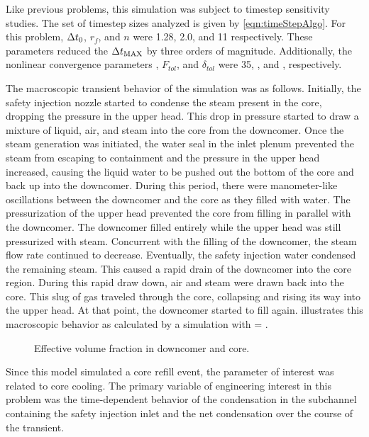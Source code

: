 Like previous problems, this simulation was subject to timestep sensitivity studies.
The set of timestep sizes analyzed is given by \eqref{eqn:timeStepAlgo}.
For this problem, $\dt{}_{0}$, $r_{f}$, and ${n}$ were 1.28, 2.0, and 11 respectively.
These parameters reduced the $\dtmax{}$ by three orders of magnitude.
Additionally, the nonlinear convergence parameters \kmax{}, $F_{tol}$, and $\delta_{tol}$ were 35, , and , respectively.

The macroscopic transient behavior of the simulation was as follows.
Initially, the safety injection nozzle started to condense the steam present in the core, dropping the pressure in the upper head.
This drop in pressure started to draw a mixture of liquid, air, and steam into the core from the downcomer.
Once the steam generation was initiated, the water seal in the inlet plenum prevented the steam from escaping to containment and the pressure in the upper head increased, causing the liquid water to be pushed out the bottom of the core and back up into the downcomer.
During this period, there were manometer-like oscillations between the downcomer and the core as they filled with water.
The pressurization of the upper head prevented the core from filling in parallel with the downcomer.
The downcomer filled entirely while the upper head was still pressurized with steam.
Concurrent with the filling of the downcomer, the steam flow rate continued to decrease.
Eventually, the safety injection water condensed the remaining steam.
This caused a rapid drain of the downcomer into the core region.
During this rapid draw down, air and steam were drawn back into the core.
This slug of gas traveled through the core, collapsing and rising its way into the upper head.
At that point, the downcomer started to fill again.
 illustrates this macroscopic behavior as calculated by a simulation with \dtmax{} = .

\begin{figure}[h!tb]
\centering

\caption{Effective volume fraction in downcomer and core.}
\label{fig:refillCoreVolFracDom}
\end{figure}

Since this model simulated a core refill event, the parameter of interest was related to core cooling.
The primary variable of engineering interest in this problem was the time-dependent behavior of the condensation in the subchannel containing the safety injection inlet and the net condensation over the course of the transient.

